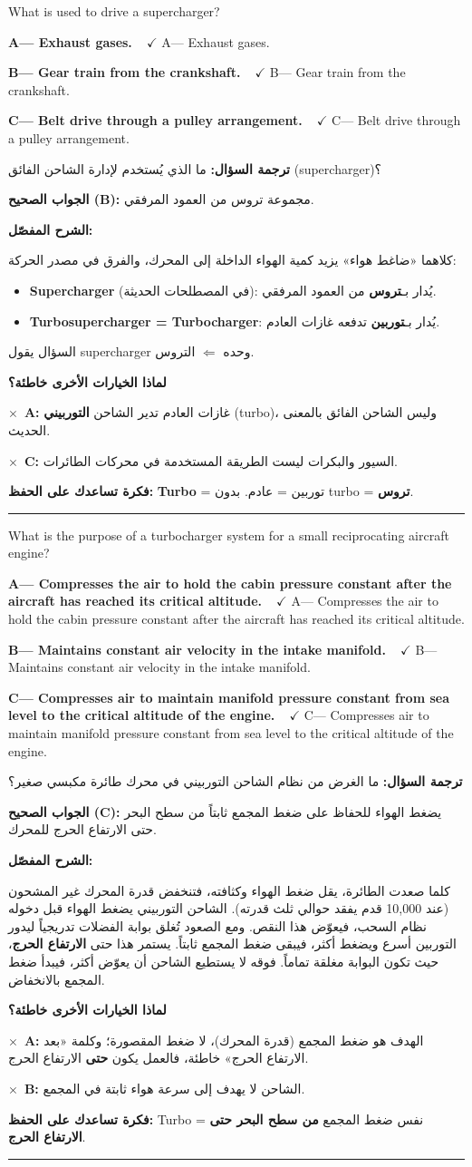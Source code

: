 \documentclass[11pt,a4paper]{article}
\newcommand{\en}[1]{\textenglish{#1}}
\newcommand{\correctletter}{}
\newcommand{\opt}[2]{%
  \ifdefstring{\correctletter}{#1}%
    {\textcolor{ansgreen}{\textbf{#1— #2\ \ $\checkmark$}}}%
    {#1— #2}\par}
\newcommand{\Q}[6]{%
  \renewcommand{\correctletter}{#6}%
  \par\bigskip
  \phantomsection\label{q#1}%
  \begin{tcolorbox}[enhanced,breakable,colback=qback,colframe=qframe,
      arc=2mm,boxrule=0.8pt,fonttitle=\bfseries,
      title={\en{Question #1}}]
    \begin{english}
      #2\par\smallskip
      \opt{A}{#3}\opt{B}{#4}\opt{C}{#5}
    \end{english}
  \end{tcolorbox}}
\newcommand{\tr}[1]{\textbf{\textcolor{qframe}{ترجمة السؤال:}} #1\par}
\newcommand{\ans}[2]{%
  \begin{tcolorbox}[colback=ansback,colframe=ansgreen,boxrule=0.6pt,arc=1.5mm,
      left=4pt,right=4pt,top=2pt,bottom=2pt]
    \textbf{\textcolor{ansgreen}{الجواب الصحيح (\en{#1}):}} #2
  \end{tcolorbox}}
\newcommand{\sharh}[1]{\textbf{\textcolor{conceptc}{الشرح المفصّل:}}\par #1\par}
\newcommand{\nohead}{\textbf{\textcolor{wrongc}{لماذا الخيارات الأخرى خاطئة؟}}\par}
\newcommand{\no}[2]{\hspace*{1em}\textcolor{wrongc}{$\times$}\ \textbf{\en{#1}:} #2\par}
\newcommand{\tip}[1]{%
  \begin{tcolorbox}[colback=tipback,colframe=tipframe,boxrule=0.5pt,arc=1.5mm,
      left=4pt,right=4pt,top=2pt,bottom=2pt]
    \textbf{فكرة تساعدك على الحفظ:} #1
  \end{tcolorbox}}
\newcommand{\qsep}{\par\medskip\noindent\textcolor{qframe!40}{\rule{\linewidth}{0.4pt}}\par}
\begin{document}
\Q{8795}{What is used to drive a supercharger?}
{Exhaust gases.}
{Gear train from the crankshaft.}
{Belt drive through a pulley arrangement.}{B}
\tr{ما الذي يُستخدم لإدارة الشاحن الفائق (\en{supercharger})؟}
\ans{B}{مجموعة تروس من العمود المرفقي.}
\sharh{كلاهما «ضاغط هواء» يزيد كمية الهواء الداخلة إلى المحرك، والفرق في مصدر الحركة:
\begin{itemize}
  \item \textbf{\en{Supercharger}} (في المصطلحات الحديثة): يُدار بـ\textbf{تروس} من العمود المرفقي.
  \item \textbf{\en{Turbosupercharger} = \en{Turbocharger}}: يُدار بـ\textbf{توربين} تدفعه غازات العادم.
\end{itemize}
السؤال يقول \en{supercharger} وحده $\Leftarrow$ التروس.}
\nohead
\no{A}{غازات العادم تدير الشاحن \textbf{التوربيني} (\en{turbo})، وليس الشاحن الفائق بالمعنى الحديث.}
\no{C}{السيور والبكرات ليست الطريقة المستخدمة في محركات الطائرات.}
\tip{\en{\textbf{Turbo}} = توربين = عادم. بدون \en{turbo} = \textbf{تروس}.}
\qsep

\Q{8791}{What is the purpose of a turbocharger system for a small reciprocating aircraft engine?}
{Compresses the air to hold the cabin pressure constant after the aircraft has reached its critical altitude.}
{Maintains constant air velocity in the intake manifold.}
{Compresses air to maintain manifold pressure constant from sea level to the critical altitude of the engine.}{C}
\tr{ما الغرض من نظام الشاحن التوربيني في محرك طائرة مكبسي صغير؟}
\ans{C}{يضغط الهواء للحفاظ على ضغط المجمع ثابتاً من سطح البحر حتى الارتفاع الحرج للمحرك.}
\sharh{كلما صعدت الطائرة، يقل ضغط الهواء وكثافته، فتنخفض قدرة المحرك غير المشحون (عند 10,000 قدم يفقد حوالي ثلث قدرته). الشاحن التوربيني يضغط الهواء قبل دخوله نظام السحب، فيعوّض هذا النقص. ومع الصعود تُغلق بوابة الفضلات تدريجياً ليدور التوربين أسرع ويضغط أكثر، فيبقى ضغط المجمع ثابتاً. يستمر هذا حتى \textbf{الارتفاع الحرج}، حيث تكون البوابة مغلقة تماماً. فوقه لا يستطيع الشاحن أن يعوّض أكثر، فيبدأ ضغط المجمع بالانخفاض.}
\nohead
\no{A}{الهدف هو ضغط المجمع (قدرة المحرك)، لا ضغط المقصورة؛ وكلمة «بعد الارتفاع الحرج» خاطئة، فالعمل يكون \textbf{حتى} الارتفاع الحرج.}
\no{B}{الشاحن لا يهدف إلى سرعة هواء ثابتة في المجمع.}
\tip{\en{Turbo} = نفس ضغط المجمع \textbf{من سطح البحر حتى الارتفاع الحرج}.}
\qsep
\end{document}
